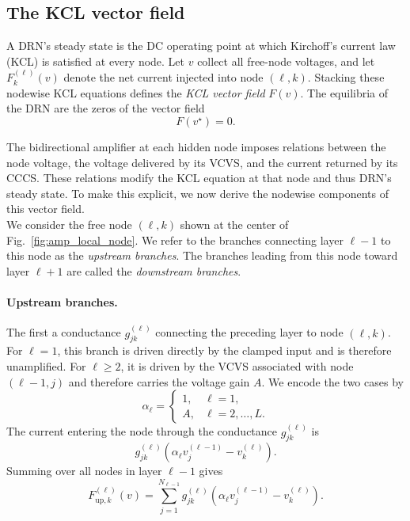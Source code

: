 \documentclass{article}
\begin{document}
\subsection{The KCL vector field}
A DRN's steady state is the DC operating point at which Kirchoff's current law (KCL) is satisfied at every node. Let $v$ collect all free-node voltages, and let
$F_k^{(\ell)}(v)$ denote the net current injected into node $(\ell,k)$.
Stacking these nodewise KCL equations defines the \emph{KCL vector field}
$F(v)$. The equilibria of the DRN are the zeros of the vector field
\begin{equation}
      F(v^\star)=0.
      \label{eq:amp_kcl_equilibrium}
  \end{equation}


The bidirectional amplifier at each hidden node imposes
relations between the node voltage, the voltage delivered by its VCVS, and
the current returned by its CCCS. These relations modify the KCL equation at
that node and thus DRN's steady state. To make this explicit, we now derive the nodewise
components of this vector field.
\\
We consider the free node
$(\ell,k)$ shown at the center of Fig.~\ref{fig:amp_local_node}. We refer to
the branches connecting layer $\ell-1$ to this node as the \emph{upstream
branches}. The branches leading from this node toward
layer $\ell+1$ are called the \emph{downstream branches}.


\paragraph{Upstream branches.}
The first a conductance $g_{jk}^{(\ell)}$ connecting the preceding layer
to node $(\ell,k)$. For $\ell=1$, this branch is driven directly by the
clamped input and is therefore unamplified. For $\ell\geq2$, it is driven by
the VCVS associated with node $(\ell-1,j)$ and therefore carries the voltage
gain $A$. We encode the two cases by
\begin{equation}
\alpha_\ell=
\begin{cases}
1, & \ell=1,\\
A, & \ell=2,\dots,L.
\end{cases}
\label{eq:amp_boundary_gain}
\end{equation}
The current entering the node
through the conductance $g_{jk}^{(\ell)}$ is
\[
g_{jk}^{(\ell)}
\left(
\alpha_\ell v_j^{(\ell-1)}-v_k^{(\ell)}
\right).
\]
Summing over all nodes in layer $\ell-1$ gives
\begin{equation}
F_{\mathrm{up},k}^{(\ell)}(v)
=
\sum_{j=1}^{N_{\ell-1}}
g_{jk}^{(\ell)}
\left(
\alpha_\ell v_j^{(\ell-1)}-v_k^{(\ell)}
\right).
\label{eq:amp_upstream_field}
\end{equation}
\end{document}
